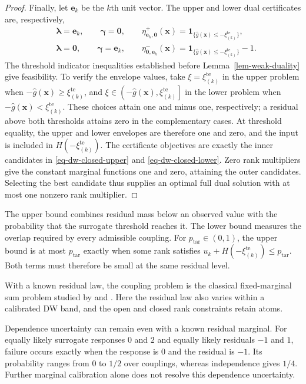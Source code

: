 \documentclass[review,11pt,3p,authoryear,nopreprintline]{elsarticle}
\begin{document}
\begin{proof}
  Finally, let $\bm e_k$ be the $k$th unit vector. The upper and lower dual certificates are, respectively,
  \begin{align*}
    &\bm\lambda=\bm e_k,\qquad \bm\gamma=\bm 0,\qquad
      \eta^+_{\bm e_k,\bm 0}(\bm x)
      =\mathbf1_{\{\hat g(\bm x)\le-\xi_{(k)}^{\mathrm{te}}\}},\\
    &\bm\lambda=\bm 0,\qquad \bm\gamma=\bm e_k,\qquad
      \eta^-_{\bm 0,\bm e_k}(\bm x)
      =\mathbf1_{\{\hat g(\bm x)\le-\xi_{(k)}^{\mathrm{te}}\}}-1.
  \end{align*}
  The threshold indicator inequalities established before Lemma~\ref{lem-weak-duality} give feasibility. To verify the envelope values, take $\xi=\xi_{(k)}^{\mathrm{te}}$ in the upper problem when $-\hat g(\bm x)\ge\xi_{(k)}^{\mathrm{te}}$, and $\xi\in\left(-\hat g(\bm x),\xi_{(k)}^{\mathrm{te}}\right]$ in the lower problem when $-\hat g(\bm x)<\xi_{(k)}^{\mathrm{te}}$. These choices attain one and minus one, respectively; a residual above both thresholds attains zero in the complementary cases. At threshold equality, the upper and lower envelopes are therefore one and zero, and the input is included in $H\left(-\xi_{(k)}^{\mathrm{te}}\right)$. The certificate objectives are exactly the inner candidates in \eqref{eq-dw-closed-upper} and \eqref{eq-dw-closed-lower}. Zero rank multipliers give the constant marginal functions one and zero, attaining the outer candidates. Selecting the best candidate thus supplies an optimal full dual solution with at most one nonzero rank multiplier.
\end{proof}

The upper bound combines residual mass below an observed value with the probability that the surrogate threshold reaches it. The lower bound measures the overlap required by every admissible coupling. For $p_{\mathrm{tar}}\in(0,1)$, the upper bound is at most $p_{\mathrm{tar}}$ exactly when some rank satisfies $u_k+H\left(-\xi_{(k)}^{\mathrm{te}}\right)\le p_{\mathrm{tar}}$. Both terms must therefore be small at the same residual level.

With a known residual law, the coupling problem is the classical fixed-marginal sum problem studied by \citet{M82} and \citet{F.N.S87}. Here the residual law also varies within a calibrated DW band, and the open and closed rank constraints retain atoms.

Dependence uncertainty can remain even with a known residual marginal. For equally likely surrogate responses $0$ and $2$ and equally likely residuals $-1$ and $1$, failure occurs exactly when the response is $0$ and the residual is $-1$. Its probability ranges from $0$ to $1/2$ over couplings, whereas independence gives $1/4$. Further marginal calibration alone does not resolve this dependence uncertainty.
\end{document}
